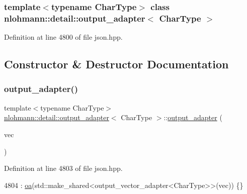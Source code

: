 \subsubsection*{template$<$typename Char\+Type$>$\newline
class nlohmann\+::detail\+::output\+\_\+adapter$<$ Char\+Type $>$}



Definition at line 4800 of file json.\+hpp.



\subsection{Constructor \& Destructor Documentation}
\mbox{\label{classnlohmann_1_1detail_1_1output__adapter_a117bda35bc3de85fd2f5f2153d9705b4}} 
\subsubsection{\texorpdfstring{output\+\_\+adapter()}{output\_adapter()}\hspace{0.1cm}{\footnotesize\ttfamily [1/3]}}
{\footnotesize\ttfamily template$<$typename Char\+Type$>$ \\
\hyperlink{classnlohmann_1_1detail_1_1output__adapter}{nlohmann\+::detail\+::output\+\_\+adapter}$<$ Char\+Type $>$\+::\hyperlink{classnlohmann_1_1detail_1_1output__adapter}{output\+\_\+adapter} (\begin{DoxyParamCaption}\item[{std\+::vector$<$ Char\+Type $>$ \&}]{vec }\end{DoxyParamCaption})\hspace{0.3cm}{\ttfamily [inline]}}



Definition at line 4803 of file json.\+hpp.


\begin{DoxyCode}
4804         : \hyperlink{classnlohmann_1_1detail_1_1output__adapter_a91f4b157cc22524555a5dce16aa56278}{oa}(std::make\_shared<output\_vector\_adapter<CharType>>(vec)) \{\}
\end{DoxyCode}
\mbox{\label{classnlohmann_1_1detail_1_1output__adapter_ac086bc101f246eb815e46f17a9e68a4a}} 
